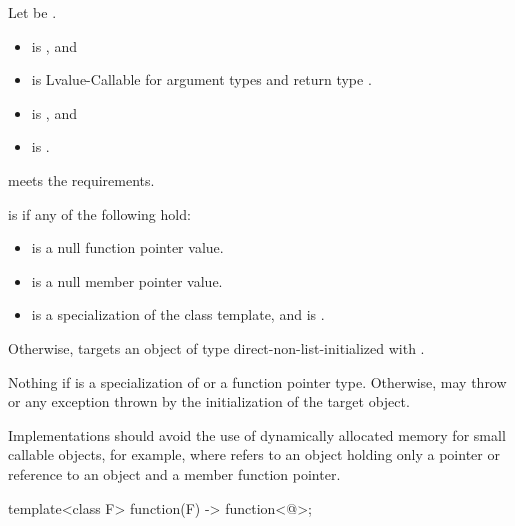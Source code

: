 \begin{itemdescr}
\pnum
Let  be .

\pnum
\constraints
\begin{itemize}
\item
{} is , and
\item
{} is Lvalue-Callable for argument types
 and return type .
\end{itemize}

\pnum
\mandates
\begin{itemize}
\item
{} is , and
\item
{} is .
\end{itemize}

\pnum
\expects
{} meets the  requirements.

\pnum
\ensures
{} is  if any of the following hold:
\begin{itemize}
\item {} is a null function pointer value.
\item {} is a null member pointer value.
\item {} is
a specialization of the  class template, and
 is .
\end{itemize}

\pnum
Otherwise,  targets an object of type 
direct-non-list-initialized with .

\pnum
\throws
Nothing if  is
a specialization of  or
a function pointer type.
Otherwise, may throw  or
any exception thrown by the initialization of the target object.

\pnum
\recommended
Implementations should avoid the use of
dynamically allocated memory for small callable objects, for example,
where  refers to an object holding only a pointer or
reference to an object and a member function pointer.
\end{itemdescr}


\begin{itemdecl}
template<class F> function(F) -> function<@\seebelow@>;
\end{itemdecl}

